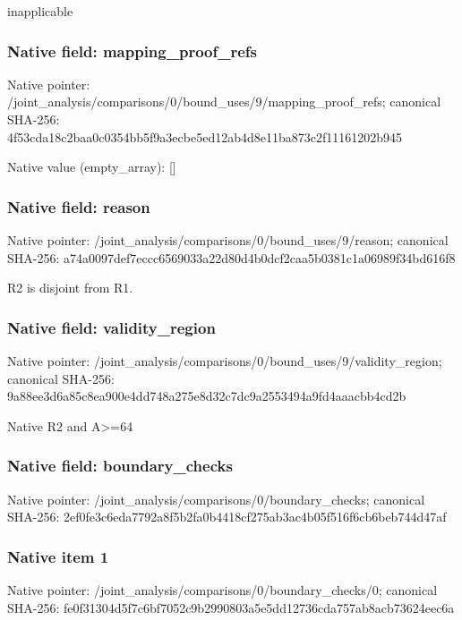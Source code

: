 \documentclass[10pt,a4paper]{article}
\begin{document}
\begingroup\raggedright\sloppy inapplicable\par\endgroup

\subsubsection{Native field: mapping\_\allowbreak{}proof\_\allowbreak{}refs}
Native pointer: /joint\_\allowbreak{}analysis/comparisons/0/bound\_\allowbreak{}uses/9/mapping\_\allowbreak{}proof\_\allowbreak{}refs; canonical SHA-256: 4f53cda18c2baa0c0354bb5f9a3ecbe5ed12ab4d8e11ba873c2f11161202b945

Native value (empty\_\allowbreak{}array): []

\subsubsection{Native field: reason}
Native pointer: /joint\_\allowbreak{}analysis/comparisons/0/bound\_\allowbreak{}uses/9/reason; canonical SHA-256: a74a0097def7eccc6569033a22d80d4b0dcf2caa5b0381c1a06989f34bd616f8

\begingroup\raggedright\sloppy R2 is disjoint from R1.\par\endgroup

\subsubsection{Native field: validity\_\allowbreak{}region}
Native pointer: /joint\_\allowbreak{}analysis/comparisons/0/bound\_\allowbreak{}uses/9/validity\_\allowbreak{}region; canonical SHA-256: 9a88ee3d6a85c8ea900e4dd748a275e8d32c7dc9a2553494a9fd4aaacbb4cd2b

\begingroup\raggedright\sloppy Native R2 and A>=\allowbreak{}64\par\endgroup

\subsubsection{Native field: boundary\_\allowbreak{}checks}
Native pointer: /joint\_\allowbreak{}analysis/comparisons/0/boundary\_\allowbreak{}checks; canonical SHA-256: 2ef0fe3c6eda7792a8f5b2fa0b4418cf275ab3ac4b05f516f6cb6beb744d47af

\subsubsection{Native item 1}
Native pointer: /joint\_\allowbreak{}analysis/comparisons/0/boundary\_\allowbreak{}checks/0; canonical SHA-256: fe0f31304d5f7c6bf7052c9b2990803a5e5dd12736cda757ab8acb73624eec6a
\end{document}
